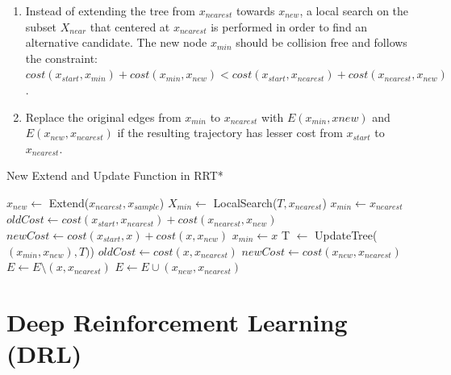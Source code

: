 \documentclass[../thesis.tex]{subfiles}
\begin{document}
\begin{enumerate}
 
      \item Instead of extending the tree from $x_{nearest}$ towards $x_{new}$, a local search on the subset $X_{near}$ that centered at $x_{nearest}$  is performed in order to find an alternative candidate. The new node $x_{min}$ should be collision free and follows the constraint: $cost(x_{start},x_{min}) + cost(x_{min}, x_{new}) < cost(x_{start},x_{nearest}) + cost(x_{nearest}, x_{new})$.
      
      \item Replace the original edges from $x_{min}$ to $x_{nearest}$ with $E(x_{min}, x{new})$ and $E(x_{new}, x_{nearest})$ if the resulting trajectory has lesser cost from $x_{start}$ to $x_{nearest}$.
 
\end{enumerate}
 
\begin{algorithm}
  \caption{New Extend and Update Function in RRT*} \label{alg:RRT_star}
  \begin{algorithmic}[1]
  \State $x_{new} \leftarrow $ Extend($x_{nearest}, x_{sample}$)
  \State $X_{min} \leftarrow $ LocalSearch($T, x_{nearest}$)
  \State $x_{min} \leftarrow x_{nearest}$
    \State $oldCost \leftarrow cost(x_{start},x_{nearest}) + cost(x_{nearest}, x_{new})$
    \State $newCost \leftarrow cost(x_{start},x) + cost(x, x_{new})$
    \State $x_{min} \leftarrow x$
    \EndIf
  \EndFor
  \State T $\leftarrow $ UpdateTree($(x_{min},x_{new}), T)$)
    \State $oldCost \leftarrow cost(x, x_{nearest})$
    \State $newCost \leftarrow cost(x_{new}, x_{nearest})$
          \State $E \leftarrow E \setminus (x, x_{nearest})$
          \State $E \leftarrow E \cup (x_{new}, x_{nearest})$
    \EndIf
  \EndFor
  \end{algorithmic}
\end{algorithm}
 
 
 
 
\section{Deep Reinforcement Learning (DRL)}
 
\end{document}
